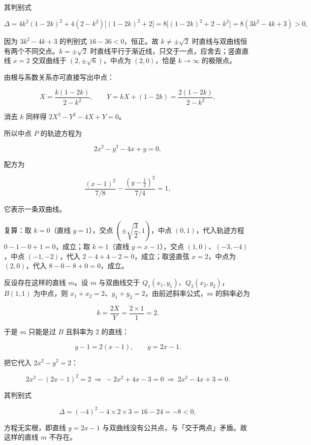 \begin{answer}
其判别式

\nopagebreak[4]
\[
\Delta=4k^2(1-2k)^2+4(2-k^2)\bigl[(1-2k)^2+2\bigr]
=8\bigl[(1-2k)^2+2-k^2\bigr]=8(3k^2-4k+3)>0,
\]

因为 $3k^2-4k+3$ 的判别式 $16-36<0$，恒正。故 $k\ne\pm\sqrt2$ 时直线与双曲线恒有两个不同交点。$k=\pm\sqrt2$ 时直线平行于渐近线，只交于一点，应舍去；竖直直线 $x=2$ 交双曲线于 $(2,\pm\sqrt6)$，中点为 $(2,0)$，恰是 $k\to\infty$ 的极限点。

由根与系数关系亦可直接写出中点：

\nopagebreak[4]
\[
X=\frac{k(1-2k)}{2-k^2},\qquad
Y=kX+(1-2k)=\frac{2(1-2k)}{2-k^2},
\]

消去 $k$ 同样得 $2X^2-Y^2-4X+Y=0$。

所以中点 $P$ 的轨迹方程为

\nopagebreak[4]
\[
2x^2-y^2-4x+y=0,
\]

配方为

\nopagebreak[4]
\[
\frac{(x-1)^2}{7/8}-\frac{\left(y-\frac12\right)^2}{7/4}=1,
\]

它表示一条双曲线。

复算：取 $k=0$（直线 $y=1$），交点 $\left(\pm\sqrt{\dfrac32},1\right)$，中点 $(0,1)$，代入轨迹方程 $0-1-0+1=0$，成立；取 $k=1$（直线 $y=x-1$），交点 $(1,0)$、$(-3,-4)$，中点 $(-1,-2)$，代入 $2-4+4-2=0$，成立；取竖直弦 $x=2$，中点为 $(2,0)$，代入 $8-0-8+0=0$，成立。


反设存在这样的直线 $m$。设 $m$ 与双曲线交于 $Q_1(x_1,y_1)$、$Q_2(x_2,y_2)$，$B(1,1)$ 为中点，则 $x_1+x_2=2$、$y_1+y_2=2$，由前述斜率公式，$m$ 的斜率必为

\nopagebreak[4]
\[
k=\frac{2X}{Y}=\frac{2\times1}{1}=2.
\]

于是 $m$ 只能是过 $B$ 且斜率为 $2$ 的直线：

\nopagebreak[4]
\[
y-1=2(x-1),\qquad y=2x-1.
\]

把它代入 $2x^2-y^2=2$：

\nopagebreak[4]
\[
2x^2-(2x-1)^2=2
\ \Longrightarrow\
-2x^2+4x-3=0
\ \Longrightarrow\
2x^2-4x+3=0.
\]

其判别式

\nopagebreak[4]
\[
\Delta=(-4)^2-4\times2\times3=16-24=-8<0,
\]

方程无实根，即直线 $y=2x-1$ 与双曲线没有公共点，与「交于两点」矛盾。故这样的直线 $m$ 不存在。


\end{answer}
